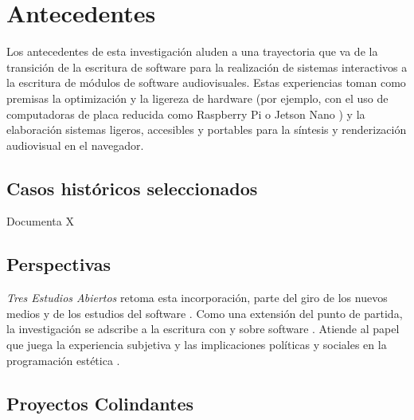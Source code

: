 
\chapter{Antecedentes}



Los antecedentes de esta investigación aluden a una trayectoria que va de la transición de la escritura de software para la realización de sistemas interactivos a la escritura de módulos de software audiovisuales. Estas experiencias toman como premisas la optimización y la ligereza de hardware (por ejemplo, con el uso de computadoras de placa reducida como Raspberry Pi o Jetson Nano ) y la elaboración sistemas ligeros, accesibles y portables para la síntesis y renderización audiovisual en el navegador.

\section{Casos históricos seleccionados}

Documenta X

\section{Perspectivas}

\textit{Tres Estudios Abiertos} retoma esta incorporación, parte del giro de los nuevos medios y de los estudios del software \citep{manovichlanguage}. Como una extensión del punto de partida, la investigación se adscribe a la escritura con y sobre software \citep{aestheticProgramming}. Atiende al papel que juega la experiencia subjetiva y las implicaciones políticas y sociales en la programación estética \citep{speakingCode}. 


\section{Proyectos Colindantes}

